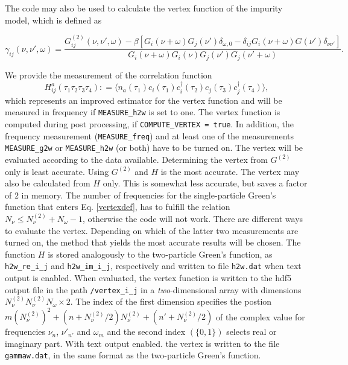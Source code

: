 \documentclass[aps,prb,floatfix,superscriptaddress,twocolumn,notitlepage]{revtex4-1}
\newcommand\Let{\mathrel{\mathop:\!\!=}}
\begin{document}
The code may also be used to calculate the vertex function of the impurity model, which is defined as
\begin{widetext}
\begin{equation}
\gamma_{ij}(\nu,\nu',\omega) = \frac{G^{(2)}_{ij}(\nu,\nu',\omega) - \beta[G_{i}(\nu+\omega)G_{j}(\nu')\delta_{\omega,0} - \delta_{ij}G_{i}(\nu+\omega)G(\nu')\delta_{\nu\nu'}]}{G_{i}(\nu+\omega)G_{i}(\nu)G_{j}(\nu')G_{j}(\nu'+\omega)}.
\label{vertexdef}
\end{equation}
\end{widetext}
We provide the measurement of the correlation function
\begin{equation}
H^{a}_{ij}(\tau_{1}\tau_{2}\tau_{3}\tau_{4}) \Let \langle n_{a}(\tau_{1})c_{i}(\tau_{1})c^{\dagger}_{i}(\tau_{2})c_{j}(\tau_{3})c^{\dagger}_{j}(\tau_{4})\rangle,
\end{equation}
which represents an improved estimator for the vertex function\cite{Hafermann12} and will be measured in frequency if \verb#MEASURE_h2w# is set to one.
The vertex function is computed during post processing, if \verb#COMPUTE_VERTEX = true#. In addition, the frequency measurement (\verb#MEASURE_freq#) and at least one of the measurements \verb#MEASURE_g2w# or \verb#MEASURE_h2w# (or both) have to be turned on. The vertex will be evaluated according to the data available. Determining the vertex from $G^{(2)}$ only is least accurate. Using $G^{(2)}$ and $H$ is the most accurate. The vertex may also be calculated from $H$ only. This is somewhat less accurate, but saves a factor of $2$ in memory.
The number of frequencies for the single-particle Green's function that enters Eq. \eqref{vertexdef}, has to fulfill the relation $N_{\nu}\leq N_{\nu}^{(2)}+N_{\omega}-1$, otherwise the code will not work.
There are different ways to evaluate the vertex. Depending on which of the latter two measurements are turned on, the method that yields the most accurate results will be chosen.
The function $H$ is stored analogously to the two-particle Green's function, as \verb#h2w_re_i_j# and \verb#h2w_im_i_j#, respectively and written to file \verb#h2w.dat# when text output is enabled.
When evaluated, the vertex function is written to the hdf5 output file in the path \verb#/vertex_i_j# in a \emph{two}-dimensional array with dimensions $N_{\nu}^{(2)}N_{\nu}^{(2)}N_{\omega}\times 2$. The index of the first dimension specifies the postion $m(N^{(2)}_\nu)^{2} + (n+N^{(2)}_{\nu}/2)N^{(2)}_{\nu} + (n'+N^{(2)}_{\nu}/2)$ of the complex value for frequencies $\nu_{n}$, $\nu'_{n'}$ and $\omega_{m}$ and the second index $(\{0,1\})$ selects real or imaginary part.
With text output enabled. the vertex is written to the file \verb#gammaw.dat#, in the same format as the two-particle Green's function.
\end{document}
